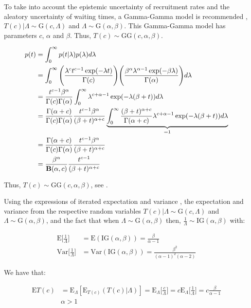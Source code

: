 To take into account the epistemic uncertainty of recruitment rates and the aleatory uncertainty of waiting times, a Gamma-Gamma model is recommended \citep{bagiella2001predicting}, $T(c)|\Lambda \sim \textrm{G}(c, \Lambda)$ and $\Lambda \sim \textrm{G}(\alpha,\beta)$. This Gamma-Gamma model has parameters $c$, $\alpha$ and $\beta$. Thus, $T(c)\sim \textrm{GG}(c, \alpha, \beta)$.


\begin{align*}
p(t) &= \int_0^{\infty} p(t|\lambda) p(\lambda) d\lambda\\
&= \int_0^{\infty}\Bigg( \frac{\lambda^ct^{c-1}\exp(-\lambda t)}{\Gamma(c)}\Bigg)\Bigg(\frac{\beta^{\alpha}\lambda^{\alpha-1}\exp(-\beta \lambda)}{\Gamma(\alpha)}\Bigg)d\lambda \\
&=\frac{t^{c-1}\beta^{\alpha}}{\Gamma(c)\Gamma(\alpha)}\int_0^{\infty}\lambda^{c+\alpha-1}\exp(-\lambda(\beta+t))d\lambda\\
&=\frac{\Gamma(\alpha+c)}{\Gamma(c)\Gamma(\alpha)}\frac{t^{c-1}\beta^{\alpha}}{(\beta+t)^{\alpha+c}}\underbrace{\int_0^{\infty}\frac{(\beta+t)^{\alpha+c}}{\Gamma(\alpha+c)}\lambda^{c+\alpha-1}\exp(-\lambda(\beta+t))d\lambda}_{=1}\\
&=\frac{\Gamma(\alpha+c)}{\Gamma(c)\Gamma(\alpha)}\frac{t^{c-1}\beta^{\alpha}}{(\beta+t)^{\alpha+c}}\\
&=\frac{\beta^{\alpha}}{{\mathbf{B}}(\alpha, c)}\frac{t^{c-1}}{(\beta+t)^{\alpha+c}}
\end{align*}

Thus, $T(c)\sim \textrm{GG} (c, \alpha, \beta)$, see \cite{held2014applied}.

Using the expressions of iterated expectation and variance \citep{held2014applied}, the expectation and variance from the respective random variables $T(c)|\Lambda \sim \textrm{G}(c, \Lambda)$ and $\Lambda \sim \textrm{G}(\alpha,\beta)$, and the fact that when $\Lambda \sim \textrm{G}(\alpha, \beta)$ then, $\frac{1}{\Lambda} \sim \textrm{IG}(\alpha, \beta)$ with:

\begin{align*}
\textrm{E}\Bigg [\frac{1}{\Lambda}\Bigg ] &=\textrm{E}(\textrm{IG}(\alpha, \beta)) = \frac{\beta}{\alpha-1}\\
\textrm{Var}\Bigg [\frac{1}{\Lambda}\Bigg ] & =\textrm{Var}(\textrm{IG}(\alpha, \beta)) = \frac{\beta^2}{(\alpha-1)^2(\alpha-2)}
\end{align*}

We have that:

\begin{align*}
\textrm{E}T(c) &= \textrm{E}_{\Lambda}[\textrm{E}_{T(c)} (T(c)|\Lambda)] = \textrm{E}_{\Lambda}\Bigg [\frac{c}{\Lambda}\Bigg ] = c \textrm{E}_{\Lambda}\Bigg [\frac{1}{\Lambda}\Bigg ] = c\frac{\beta}{\alpha-1}\\
&\alpha>1
\end{align*}


